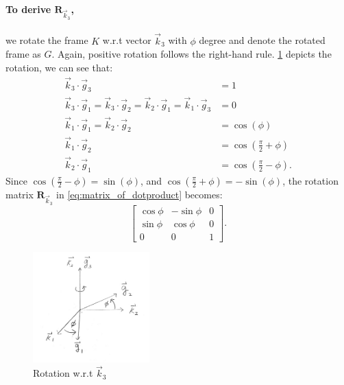 \documentclass{article}
\newcommand{\mat}[1]{\mathbf{#1}}
\newcommand{\MR}{\mat{R}}
\begin{document}
\paragraph{To derive $\MR_{\vec{k}_3}$,} we rotate the frame $K$ w.r.t vector $\vec{k}_3$ with $\phi$ degree and denote the rotated frame as $G$. Again, positive rotation follows the right-hand rule. \cref{fig:third_rotation} depicts the rotation, we can see that:
\begin{align*}
    \vec{k}_3\cdot\vec{g}_3 &=1 \\
    \vec{k}_3\cdot\vec{g}_1 = \vec{k}_3\cdot\vec{g}_2 = \vec{k}_2\cdot\vec{g}_1 = \vec{k}_1\cdot\vec{g}_3 &= 0 \\
    \vec{k}_1\cdot\vec{g}_1 = \vec{k}_2\cdot\vec{g}_2 &=\cos{(\phi)}\\
    \vec{k}_1\cdot\vec{g}_2 &=\cos{(\frac{\pi}{2} + \phi)} \\
    \vec{k}_2\cdot\vec{g}_1 &=\cos{(\frac{\pi}{2} - \phi)}.
\end{align*}
Since $\cos{(\frac{\pi}{2} - \phi)} = \sin{(\phi)}$, and $\cos{(\frac{\pi}{2} + \phi)} = -\sin{(\phi)}$, the rotation matrix $\MR_{\vec{k}_3}$ in \cref{eq:matrix_of_dotproduct} becomes:
\begin{equation*}
    \begin{bmatrix}
      \cos{\phi} & -\sin{\phi} & 0 \\
      \sin{\phi} & \cos{\phi} & 0 \\
      0 & 0 & 1
    \end{bmatrix}.
\end{equation*}

\begin{figure}[h]
    \centering
    \includegraphics[width=0.4\textwidth]{Figures/UWS-rotation-third.png}
    \caption{Rotation w.r.t $\vec{k}_3$}
    \label{fig:third_rotation}
\end{figure}
\end{document}
